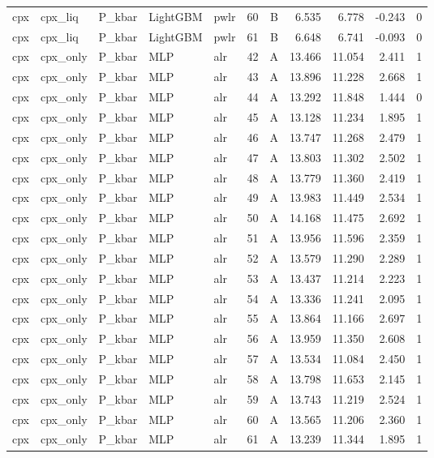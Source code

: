 \begin{longtable}{lllllrrrrrr}
cpx & cpx\_liq & P\_kbar & LightGBM & pwlr & 60 & B & 6.535 & 6.778 & -0.243 & 0 \\
cpx & cpx\_liq & P\_kbar & LightGBM & pwlr & 61 & B & 6.648 & 6.741 & -0.093 & 0 \\
cpx & cpx\_only & P\_kbar & MLP & alr & 42 & A & 13.466 & 11.054 & 2.411 & 1 \\
cpx & cpx\_only & P\_kbar & MLP & alr & 43 & A & 13.896 & 11.228 & 2.668 & 1 \\
cpx & cpx\_only & P\_kbar & MLP & alr & 44 & A & 13.292 & 11.848 & 1.444 & 0 \\
cpx & cpx\_only & P\_kbar & MLP & alr & 45 & A & 13.128 & 11.234 & 1.895 & 1 \\
cpx & cpx\_only & P\_kbar & MLP & alr & 46 & A & 13.747 & 11.268 & 2.479 & 1 \\
cpx & cpx\_only & P\_kbar & MLP & alr & 47 & A & 13.803 & 11.302 & 2.502 & 1 \\
cpx & cpx\_only & P\_kbar & MLP & alr & 48 & A & 13.779 & 11.360 & 2.419 & 1 \\
cpx & cpx\_only & P\_kbar & MLP & alr & 49 & A & 13.983 & 11.449 & 2.534 & 1 \\
cpx & cpx\_only & P\_kbar & MLP & alr & 50 & A & 14.168 & 11.475 & 2.692 & 1 \\
cpx & cpx\_only & P\_kbar & MLP & alr & 51 & A & 13.956 & 11.596 & 2.359 & 1 \\
cpx & cpx\_only & P\_kbar & MLP & alr & 52 & A & 13.579 & 11.290 & 2.289 & 1 \\
cpx & cpx\_only & P\_kbar & MLP & alr & 53 & A & 13.437 & 11.214 & 2.223 & 1 \\
cpx & cpx\_only & P\_kbar & MLP & alr & 54 & A & 13.336 & 11.241 & 2.095 & 1 \\
cpx & cpx\_only & P\_kbar & MLP & alr & 55 & A & 13.864 & 11.166 & 2.697 & 1 \\
cpx & cpx\_only & P\_kbar & MLP & alr & 56 & A & 13.959 & 11.350 & 2.608 & 1 \\
cpx & cpx\_only & P\_kbar & MLP & alr & 57 & A & 13.534 & 11.084 & 2.450 & 1 \\
cpx & cpx\_only & P\_kbar & MLP & alr & 58 & A & 13.798 & 11.653 & 2.145 & 1 \\
cpx & cpx\_only & P\_kbar & MLP & alr & 59 & A & 13.743 & 11.219 & 2.524 & 1 \\
cpx & cpx\_only & P\_kbar & MLP & alr & 60 & A & 13.565 & 11.206 & 2.360 & 1 \\
cpx & cpx\_only & P\_kbar & MLP & alr & 61 & A & 13.239 & 11.344 & 1.895 & 1 \\

\end{longtable}
